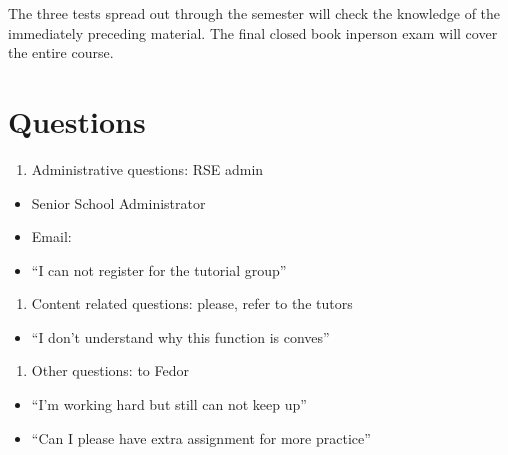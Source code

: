 \documentclass[letterpaper,10pt,english]{jupyterBook}
\begin{document}
\sphinxAtStartPar
The three tests spread out through the semester will check the knowledge of the immediately preceding material. The final closed book in\sphinxhyphen{}person exam will cover the entire course.


\chapter{Questions}
\label{\detokenize{01.introduction:questions}}\begin{enumerate}
%
\item {} 
\sphinxAtStartPar
Administrative questions: RSE admin

\end{enumerate}
\begin{itemize}
\item {} 
\sphinxAtStartPar
{} Senior School Administrator

\item {} 
\sphinxAtStartPar
Email: 

\item {} 
\sphinxAtStartPar
“I can not register for the tutorial group”

\end{itemize}
\begin{enumerate}
%
\setcounter{enumi}{1}
\item {} 
\sphinxAtStartPar
Content related questions: please, refer to the tutors

\end{enumerate}
\begin{itemize}
\item {} 
\sphinxAtStartPar
“I don’t understand why this function is conves”

\end{itemize}
\begin{enumerate}
%
\setcounter{enumi}{2}
\item {} 
\sphinxAtStartPar
Other questions: to Fedor

\end{enumerate}
\begin{itemize}
\item {} 
\sphinxAtStartPar
“I’m working hard but still can not keep up”

\item {} 
\sphinxAtStartPar
“Can I please have extra assignment for more practice”

\end{itemize}
\end{document}
